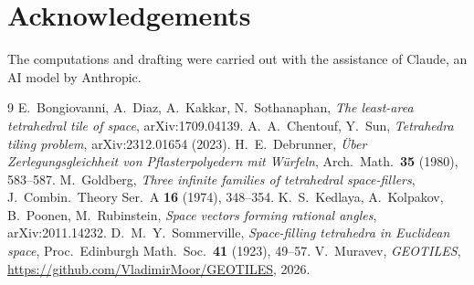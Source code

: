 \documentclass[11pt]{amsart}
\theoremstyle{definition}
\begin{document}
\section*{Acknowledgements}
The computations and drafting were carried out with the assistance of Claude, an AI model by Anthropic.

\begin{thebibliography}{9}
 E.~Bongiovanni, A.~Diaz, A.~Kakkar, N.~Sothanaphan, \emph{The least-area tetrahedral tile of space},
arXiv:1709.04139.
 A.~A.~Chentouf, Y.~Sun, \emph{Tetrahedra tiling problem}, arXiv:2312.01654 (2023).
 H.~E.~Debrunner, \emph{\"Uber Zerlegungsgleichheit von Pflasterpolyedern mit W\"urfeln}, Arch.\ Math.\
\textbf{35} (1980), 583--587.
 M.~Goldberg, \emph{Three infinite families of tetrahedral space-fillers}, J.\ Combin.\ Theory Ser.\ A
\textbf{16} (1974), 348--354.
 K.~S.~Kedlaya, A.~Kolpakov, B.~Poonen, M.~Rubinstein, \emph{Space vectors forming rational angles},
arXiv:2011.14232.
 D.~M.~Y.~Sommerville, \emph{Space-filling tetrahedra in Euclidean space}, Proc.\ Edinburgh Math.\ Soc.\
\textbf{41} (1923), 49--57.
\bibitem{code} V.~Muravev, \emph{GEOTILES}, \url{https://github.com/VladimirMoor/GEOTILES}, 2026.
\end{thebibliography}
\end{document}
